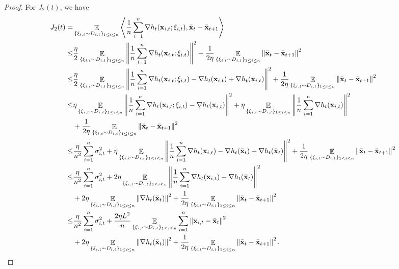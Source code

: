 \documentclass{article}
\begin{document}
\begin{proof}
For $J_2(t)$, we have
\begin{align}
\nonumber
J_2(t) = & \mathop{\mathbb{E}}_{ \{\xi_{i,t} \sim D_{i,t}\}_{1\le i \le n} }\left\langle\frac{1}{n}\sum_{i=1}^n\nabla h_t({\bf x}_{i,t};\xi_{i,t}), \bar{{\bf x}}_t - \bar{{\bf x}}_{t+1}  \right\rangle \\ \nonumber
\le & \frac{\eta}{2}\mathop{\mathbb{E}}_{ \{\xi_{i,t} \sim D_{i,t}\}_{1\le i \le n} } \left\lVert\frac{1}{n}\sum_{i=1}^n \nabla h_t({\bf x}_{i,t};\xi_{i,t})\right\rVert^2 + \frac{1}{2\eta} \mathop{\mathbb{E}}_{ \{\xi_{i,t} \sim D_{i,t}\}_{1\le i \le n} }\left\lVert \bar{{\bf x}}_t - \bar{{\bf x}}_{t+1}\right\rVert^2  \\ \nonumber
\le & \frac{\eta}{2}\mathop{\mathbb{E}}_{ \{\xi_{i,t} \sim D_{i,t}\}_{1\le i \le n} }\left\lVert\frac{1}{n}\sum_{i=1}^n\nabla h_t({\bf x}_{i,t};\xi_{i,t}) - \nabla h_t({\bf x}_{i,t}) + \nabla h_t({\bf x}_{i,t})\right\rVert^2 + \frac{1}{2\eta} \mathop{\mathbb{E}}_{ \{\xi_{i,t} \sim D_{i,t}\}_{1\le i \le n} }\left\lVert \bar{{\bf x}}_t - \bar{{\bf x}}_{t+1}\right\rVert^2  \\ \nonumber
\le &  \eta\mathop{\mathbb{E}}_{ \{\xi_{i,t} \sim D_{i,t}\}_{1\le i \le n} }\left\lVert\frac{1}{n}\sum_{i=1}^n\nabla h_t({\bf x}_{i,t};\xi_{i,t}) - \nabla h_t({\bf x}_{i,t})\right\rVert^2 + \eta \mathop{\mathbb{E}}_{ \{\xi_{i,t} \sim D_{i,t}\}_{1\le i \le n} }\left\lVert\frac{1}{n}\sum_{i=1}^n\nabla h_t({\bf x}_{i,t})\right\rVert^2 \\ \nonumber 
& + \frac{1}{2\eta} \mathop{\mathbb{E}}_{ \{\xi_{i,t} \sim D_{i,t}\}_{1\le i \le n} }\left\lVert \bar{{\bf x}}_t - \bar{{\bf x}}_{t+1}\right\rVert^2  \\ \nonumber
\le & \frac{\eta}{n^2} \sum_{i=1}^n\sigma_{i,t}^2 + \eta \mathop{\mathbb{E}}_{ \{\xi_{i,t} \sim D_{i,t}\}_{1\le i \le n} }\left\lVert\frac{1}{n}\sum_{i=1}^n\nabla h_t({\bf x}_{i,t}) - \nabla h_t(\bar{{\bf x}}_t) + \nabla h_t(\bar{{\bf x}}_t)\right\rVert^2 + \frac{1}{2\eta} \mathop{\mathbb{E}}_{ \{\xi_{i,t} \sim D_{i,t}\}_{1\le i \le n} }\left\lVert \bar{{\bf x}}_t - \bar{{\bf x}}_{t+1}\right\rVert^2 \\ \nonumber
\le & \frac{\eta}{n^2} \sum_{i=1}^n\sigma_{i,t}^2 + 2\eta \mathop{\mathbb{E}}_{ \{\xi_{i,t} \sim D_{i,t}\}_{1\le i \le n} }\left\lVert\frac{1}{n}\sum_{i=1}^n\nabla h_t({\bf x}_{i,t}) - \nabla h_t(\bar{{\bf x}}_t) \right\rVert^2 \\ \nonumber 
& + 2\eta \mathop{\mathbb{E}}_{ \{\xi_{i,t} \sim D_{i,t}\}_{1\le i \le n} }\left\lVert\nabla h_t(\bar{{\bf x}}_t)\right\rVert^2 + \frac{1}{2\eta} \mathop{\mathbb{E}}_{ \{\xi_{i,t} \sim D_{i,t}\}_{1\le i \le n} }\left\lVert \bar{{\bf x}}_t - \bar{{\bf x}}_{t+1}\right\rVert^2 \\ \nonumber
\le & \frac{\eta}{n^2} \sum_{i=1}^n\sigma_{i,t}^2 + \frac{2\eta L^2}{n}\mathop{\mathbb{E}}_{ \{\xi_{i,t} \sim D_{i,t}\}_{1\le i \le n} }\sum_{i=1}^n \left\lVert{\bf x}_{i,t} - \bar{{\bf x}}_t \right\rVert^2 \\ \nonumber 
& + 2\eta \mathop{\mathbb{E}}_{ \{\xi_{i,t} \sim D_{i,t}\}_{1\le i \le n} }\left\lVert\nabla h_t(\bar{{\bf x}}_t)\right\rVert^2 + \frac{1}{2\eta} \mathop{\mathbb{E}}_{ \{\xi_{i,t} \sim D_{i,t}\}_{1\le i \le n} }\left\lVert \bar{{\bf x}}_t - \bar{{\bf x}}_{t+1}\right\rVert^2.
\end{align} 




\end{proof}
\end{document}
